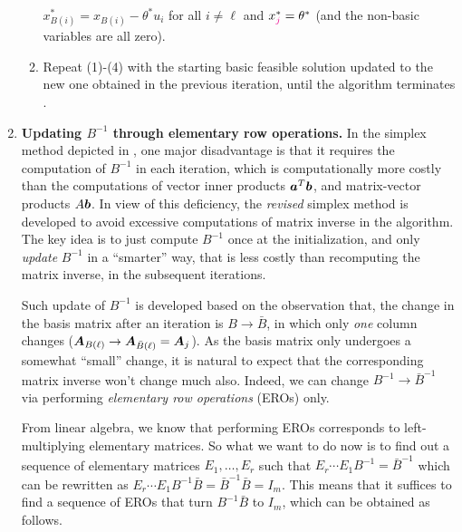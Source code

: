 \begin{enumerate}
\begin{enumerate}[label={(\arabic*)}]
\(x_{B(i)}^{*}=x_{B(i)}-\theta^{*}u_i\) for all \(i\ne\ell\) and
\(x_{\mgc{j}}^{*}=\theta^{*}\) (and the non-basic variables are all zero).
\item Repeat (1)-(4) with the starting basic feasible solution updated to the
new one obtained in the previous iteration, until the algorithm terminates
.
\end{enumerate}
\item \label{it:simplex-update-binv-eros} \textbf{Updating \(B^{-1}\) through
elementary row operations.} In the simplex method depicted in
, one major disadvantage is that it requires
the computation of \(B^{-1}\) in each iteration, which is computationally more
costly than the computations of vector inner products \(\bm{a}^{T}\bm{b}\),
and matrix-vector products \(A\bm{b}\). In view of this deficiency, the
\emph{revised} simplex method is developed to avoid excessive computations of
matrix inverse in the algorithm. The key  idea is to just compute
\(B^{-1}\) once at the initialization, and only \emph{update} \(B^{-1}\) in a
``smarter'' way, that is less costly than recomputing the matrix inverse, in
the subsequent iterations.

Such update of \(B^{-1}\) is developed based on the observation that, the
change in the basis matrix after an iteration is \(B\to\bar{B}\), in which only
\emph{one} column changes (\(\bm{A}_{B(\ell)}\to \bm{A}_{\bar{B}(\ell)}=\bm{A}_j\)).
As the basis matrix only undergoes a somewhat ``small'' change, it is natural
to expect that the corresponding matrix inverse won't change much also. Indeed,
we can change \(B^{-1}\to\bar{B}^{-1}\) via performing \emph{elementary row
operations} (EROs) only.

From linear algebra, we know that performing EROs corresponds to
left-multiplying elementary matrices. So what we want to do now is to find out
a sequence of elementary matrices \(E_1,\dotsc,E_r\) such that \(E_r\dotsb
E_1B^{-1}=\bar{B}^{-1}\) which can be rewritten as \(E_r\dotsb
E_1B^{-1}\bar{B}=\bar{B}^{-1}\bar{B}=I_m\). This means that it suffices to find
a sequence of EROs that turn \(B^{-1}\bar{B}\) to \(I_m\), which can be
obtained as follows.


\end{enumerate}
